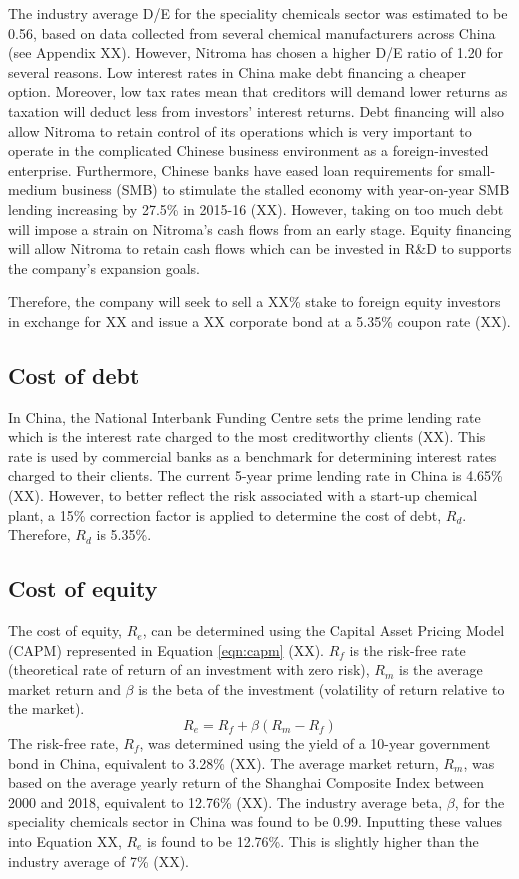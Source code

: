 The industry average D/E for the speciality chemicals sector was estimated to be 0.56, based on data collected from several chemical manufacturers across China (see Appendix XX). However, Nitroma has chosen a higher D/E ratio of 1.20 for several reasons. Low interest rates in China make debt financing a cheaper option. Moreover, low tax rates mean that creditors will demand lower returns as taxation will deduct less from investors’ interest returns. Debt financing will also allow Nitroma to retain control of its operations which is very important to operate in the complicated Chinese business environment as a foreign-invested enterprise. Furthermore, Chinese banks have eased loan requirements for small-medium business (SMB) to stimulate the stalled economy with year-on-year SMB lending increasing by 27.5\% in 2015-16 (XX). However, taking on too much debt will impose a strain on Nitroma’s cash flows from an early stage. Equity financing will allow Nitroma to retain cash flows which can be invested in R\&D to supports the company’s expansion goals.

Therefore, the company will seek to sell a XX\% stake to foreign equity investors in exchange for XX and issue a XX corporate bond at a 5.35\% coupon rate (XX).

\subsection{Cost of debt}
\label{sec:debt}
In China, the National Interbank Funding Centre sets the prime lending rate which is the interest rate charged to the most creditworthy clients (XX). This rate is used by commercial banks as a benchmark for determining interest rates charged to their clients. The current 5-year prime lending rate in China is 4.65\% (XX). However, to better reflect the risk associated with a start-up chemical plant, a 15\% correction factor is applied to determine the cost of debt, $R_{d}$. Therefore, $R_{d}$ is 5.35\%.

\subsection{Cost of equity}
\label{sec:equity}
The cost of equity, $R_{e}$, can be determined using the Capital Asset Pricing Model (CAPM) represented in Equation \ref{eqn:capm} (XX). $R_{f}$ is the risk-free rate (theoretical rate of return of an investment with zero risk), $R_{m}$ is the average market return and $\beta$ is the beta of the investment (volatility of return relative to the market).
\begin{equation}
\label{eqn:capm}
    R_{e}=R_{f}+\beta(R_{m}-R_{f})
\end{equation}
The risk-free rate, $R_{f}$, was determined using the yield of a 10-year government bond in China, equivalent to 3.28\% (XX). The average market return, $R_{m}$, was based on the average yearly return of the Shanghai Composite Index between 2000 and 2018, equivalent to 12.76\% (XX). The industry average beta, $\beta$, for the speciality chemicals sector in China was found to be 0.99. Inputting these values into Equation XX, $R_{e}$ is found to be 12.76\%. This is slightly higher than the industry average of 7\% (XX).

